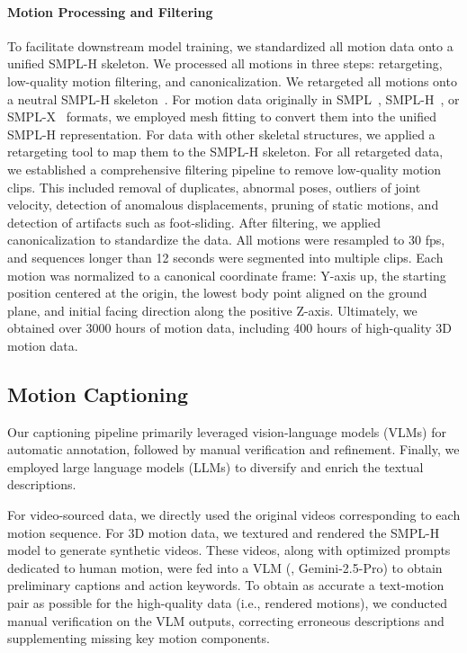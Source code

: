 \paragraph{Motion Processing and Filtering}

To facilitate downstream model training, we standardized all motion data onto a unified SMPL-H skeleton. We processed all motions in three steps: retargeting, low-quality motion filtering, and canonicalization.
We retargeted all motions onto a neutral SMPL-H skeleton~\citep{smplh}.
For motion data originally in SMPL~\citep{smpl}, SMPL-H~\citep{smplh}, or SMPL-X~\citep{smplx} formats, we employed mesh fitting to convert them into the unified SMPL-H representation.
For data with other skeletal structures, we applied a retargeting tool to map them to the SMPL-H skeleton.
For all retargeted data, we established a comprehensive filtering pipeline to remove low-quality motion clips.
This included removal of duplicates, abnormal poses, outliers of joint velocity, detection of anomalous displacements, pruning of static motions, and detection of artifacts such as foot-sliding.
After filtering, we applied canonicalization to standardize the data.
All motions were resampled to 30 fps, and sequences longer than 12 seconds were segmented into multiple clips.
Each motion was normalized to a canonical coordinate frame: Y-axis up, the starting position centered at the origin, the lowest body point aligned on the ground plane, and initial facing direction along the positive Z-axis.
Ultimately, we obtained over 3000 hours of motion data, including 400 hours of high-quality 3D motion data.




\subsection{Motion Captioning}
\label{subsec:captioning}





Our captioning pipeline primarily leveraged vision-language models (VLMs) for automatic annotation, followed by manual verification and refinement. Finally, we employed large language models (LLMs) to diversify and enrich the textual descriptions.

For video-sourced data, we directly used the original videos corresponding to each motion sequence.
For 3D motion data, we textured and rendered the SMPL-H model to generate synthetic videos.
These videos, along with optimized prompts dedicated to human motion, were fed into a VLM (\eg, Gemini-2.5-Pro) to obtain preliminary captions and action keywords.
To obtain as accurate a text-motion pair as possible for the high-quality data (i.e., rendered motions),
we conducted manual verification on the VLM outputs, correcting erroneous descriptions and supplementing missing key motion components.

